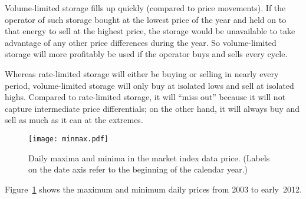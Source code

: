 \documentclass[12pt, a4paper]{article}
\begin{document}
Volume-limited storage fills up quickly (compared to price
movements). If the operator of such storage bought at the lowest price
of the year and held on to that energy to sell at the highest price,
the storage would be unavailable to take advantage of any other price
differences during the year. So volume-limited storage will more
profitably be used if the operator buys and sells every cycle.

Whereas rate-limited storage will either be buying or selling in
nearly every period, volume-limited storage will only buy at isolated
lows and sell at isolated highs. Compared to rate-limited storage, it
will ``miss out'' because it will not capture intermediate price
differentials; on the other hand, it will always buy and sell as much
as it can at the extremes. 

\begin{figure}[htb]
\centering
\texttt{[image: minmax.pdf]}
\caption{Daily maxima and minima in the market index data
  price. (Labels on the date axis refer to the beginning of the
  calendar year.)}
\label{fig:minmax}
\end{figure}

Figure~\ref{fig:minmax} shows the maximum and minimum daily prices
from 2003 to early~2012.
\end{document}

